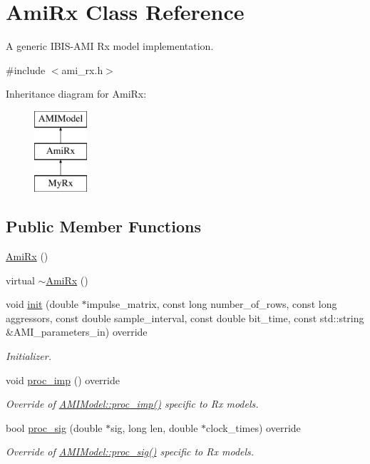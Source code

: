 \hypertarget{class_ami_rx}{}\section{Ami\+Rx Class Reference}
\label{class_ami_rx}


A generic I\+B\+I\+S-\/\+A\+M\+I Rx model implementation.  




{\ttfamily \#include $<$ami\+\_\+rx.\+h$>$}

Inheritance diagram for Ami\+Rx\+:\begin{figure}[H]
\begin{center}
\leavevmode
\includegraphics[height=3.000000cm]{class_ami_rx}
\end{center}
\end{figure}
\subsection*{Public Member Functions}
\begin{DoxyCompactItemize}
\item 
\hyperlink{class_ami_rx_a025faccfe2a5c56888da32370050b46e}{Ami\+Rx} ()
\item 
virtual \hyperlink{class_ami_rx_a93d8a169660a911021566682e02da75f}{$\sim$\+Ami\+Rx} ()
\item 
void \hyperlink{class_ami_rx_afb9c0d0efb4722c09529a05e3fb2b263}{init} (double $\ast$impulse\+\_\+matrix, const long number\+\_\+of\+\_\+rows, const long aggressors, const double sample\+\_\+interval, const double bit\+\_\+time, const std\+::string \&A\+M\+I\+\_\+parameters\+\_\+in) override
\begin{DoxyCompactList}\small\item\em Initializer. \end{DoxyCompactList}\item 
void \hyperlink{class_ami_rx_a74a1a6c1ac9a46634cb0d0ab56b83c4e}{proc\+\_\+imp} () override
\begin{DoxyCompactList}\small\item\em Override of \hyperlink{class_a_m_i_model_a52d1f23607e7f12fa1ab61d809231c11}{A\+M\+I\+Model\+::proc\+\_\+imp()} specific to Rx models. \end{DoxyCompactList}\item 
bool \hyperlink{class_ami_rx_aac00499d02f5e4a3f2ddce49c5b1599f}{proc\+\_\+sig} (double $\ast$sig, long len, double $\ast$clock\+\_\+times) override
\begin{DoxyCompactList}\small\item\em Override of \hyperlink{class_a_m_i_model_abb1d05835230a1b0e8f6b98002d8f4ef}{A\+M\+I\+Model\+::proc\+\_\+sig()} specific to Rx models. \end{DoxyCompactList}\end{DoxyCompactItemize}
